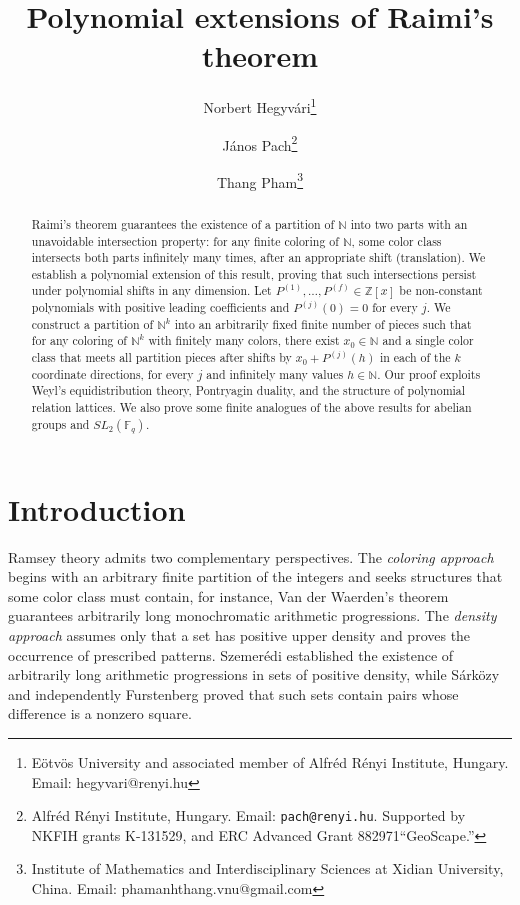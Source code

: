 \documentclass[11pt]{article}
\theoremstyle{definition}
\begin{document}
\title{Polynomial extensions of Raimi's theorem}
\author{Norbert Hegyv\'{a}ri\thanks{E\"otv\"os University and associated member of Alfr\'{e}d R\'{e}nyi Institute, Hungary. Email: hegyvari@renyi.hu} \and J\'{a}nos Pach\thanks{Alfr\'{e}d R\'{e}nyi Institute, Hungary. Email:
{\tt pach@renyi.hu}. \newline
\hspace*{0.5cm} Supported by NKFIH grants K-131529,  and ERC Advanced Grant 882971``GeoScape.''}\and Thang Pham\thanks{Institute of Mathematics and Interdisciplinary Sciences at Xidian University, China. \newline
\hspace*{0.5cm} Email: phamanhthang.vnu@gmail.com}}
\maketitle
\begin{abstract}
Raimi's theorem guarantees the existence of a partition of $\mathbb{N}$ into two parts with an un\-avoid\-able intersection property: for any finite coloring of $\mathbb{N}$, some color class intersects both parts infinitely many times, after an appropriate shift (translation). We establish a polynomial extension of this result, proving that such intersections persist under polynomial shifts in any dimension. Let $P^{(1)},\dots,P^{(f)}\in\mathbb{Z}[x]$ be non-constant polynomials with positive leading coefficients and $P^{(j)}(0)=0$ for every $j$. We construct a partition of $\mathbb{N}^k$ into an arbitrarily fixed finite number of pieces such that for any coloring of $\mathbb{N}^k$ with finitely many colors, there exist $x_0\in \mathbb{N}$ and a single color class that meets all partition pieces after shifts by $x_0+P^{(j)}(h)$ in each of the $k$ coordinate directions, for every $j$ and infinitely many values $h\in \mathbb{N}$. Our proof exploits Weyl's equi\-dis\-tri\-bu\-tion theory, Pontryagin duality, and the structure of polynomial relation lattices. We also prove some finite analogues of the above results for abelian groups and $SL_2(\mathbb{F}_q)$.%
\end{abstract}

\tableofcontents
\section{Introduction}


Ramsey theory admits two complementary perspectives. The \emph{coloring approach} begins with an arbitrary finite partition of the integers and seeks structures that some color class must contain, for instance, Van der Waerden's theorem \cite{vanderWaerden1927} guarantees arbitrarily long monochromatic arithmetic progressions. The \emph{density approach} assumes only that a set has positive upper density and proves the occurrence of prescribed patterns. Szemer\'edi \cite{Sze} established the existence of arbitrarily long arithmetic progressions in sets of positive density, while S\'ark\"ozy \cite{Sarkozy1978} and independently Furstenberg \cite{Furstenberg1977} proved that such sets contain pairs whose difference is a nonzero square.
\end{document}
